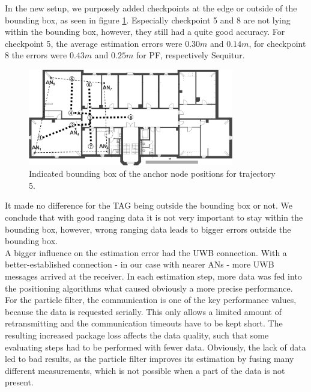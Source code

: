 In the new setup, we purposely added checkpoints at the edge or outside of the bounding box, as seen in figure \ref{fig:trajectory5_boundingBox}. Especially checkpoint 5 and 8 are not lying within the bounding box, however, they still had a quite good accuracy. For checkpoint 5, the average estimation errors were $0.30m$ and $0.14m$, for checkpoint 8 the errors were $0.43m$ and $0.25m$ for PF, respectively Sequitur.
\begin{figure}[th]
\centering
\includegraphics[width=0.8\textwidth]{Figures/trajectory5_boundingBox}
\decoRule
\caption[Trajectory 5 with Bounding Box]{Indicated bounding box of the anchor node positions for trajectory 5.}
\label{fig:trajectory5_boundingBox}
\end{figure}
It made no difference for the TAG being outside the bounding box or not. We conclude that with good ranging data it is not very important to stay within the bounding box, however, wrong ranging data leads to bigger errors outside the bounding box.\\
\noindent\hspace*{5mm}%
A bigger influence on the estimation error had the UWB connection. With a better-established connection - in our case with nearer ANs - more UWB messages arrived at the receiver. In each estimation step, more data was fed into the positioning algorithms what caused obviously a more precise performance. For the particle filter, the communication is one of the key performance values, because the data is requested serially. This only allows a limited amount of retransmitting and the communication timeouts have to be kept short. The resulting increased package loss affects the data quality, such that some evaluating steps had to be performed with fewer data. Obviously, the lack of data led to bad results, as the particle filter improves its estimation by fusing many different measurements, which is not possible when a part of the data is not present.